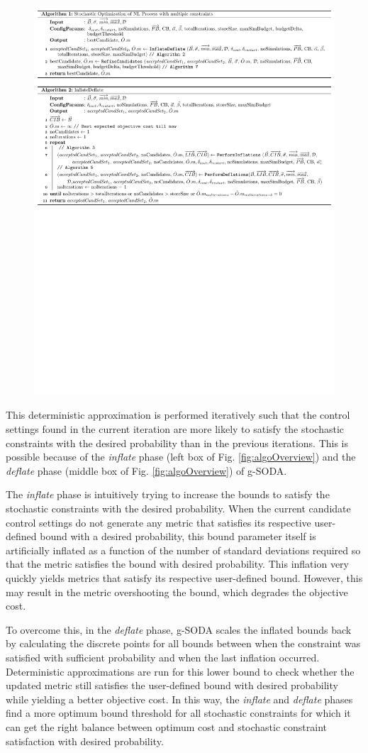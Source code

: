 \documentclass[a4paper, 12pt]{article} %
\begin{document}
\begin{figure}
	\begin{center}
	\includegraphics[width=.7\textwidth]{pseudoCode/Algo1-2.pdf}
	\end{center}

\end{figure}
This deterministic approximation is performed iteratively such that the control settings found in the current iteration are more likely to satisfy the stochastic constraints with the desired probability than in the previous iterations. This is possible because of the \textit{inflate} phase (left box of Fig. \ref{fig:algoOverview}) and the \textit{deflate} phase (middle box of Fig. \ref{fig:algoOverview}) of g-SODA. 

The \textit{inflate} phase is intuitively trying to increase the bounds to satisfy the stochastic constraints with the desired probability. 
When the current candidate control settings do not generate any metric that satisfies its respective user-defined bound with a desired probability, this bound parameter itself is artificially inflated as a function of the number of standard deviations required so that the metric satisfies the bound with desired probability.
This inflation very quickly yields metrics that satisfy its respective user-defined bound. However, this may result in the metric overshooting the bound, which degrades the objective cost. 

To overcome this, in the \textit{deflate} phase, g-SODA scales the inflated bounds back by calculating the discrete points for all bounds between when the constraint was satisfied with sufficient probability and when the last inflation occurred.
 Deterministic approximations are run for this lower bound to check whether the updated metric still satisfies the user-defined bound with desired probability while yielding a better objective cost. 
 In this way, the \textit{inflate} and \textit{deflate} phases find a more optimum bound threshold for all stochastic constraints for which it can get the right balance between optimum cost and stochastic constraint satisfaction with desired probability.
\end{document}
